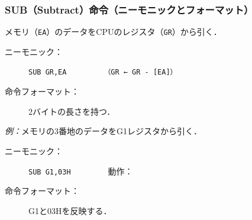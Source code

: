 \documentclass[handout]{beamer}        %
\begin{document}
\begin{frame}
  \frametitle{SUB（Subtract）命令（ニーモニックとフォーマット）}
  メモリ（\texttt{EA}）のデータをCPUのレジスタ（\texttt{GR}）から引く．

  \begin{description}
  \item[ニーモニック：]\texttt{SUB GR,EA}~~~~~~~~~\texttt{（GR ← GR - [EA]）}
    \vfill

  \item[命令フォーマット：] 2バイトの長さを持つ．\\
  \end{description}
  \vfill

  \emph{例：}メモリの3番地のデータをG1レジスタから引く．
  \begin{description}
  \item[ニーモニック：]\texttt{SUB G1,03H}~~~~~~~~~動作：

  \item[命令フォーマット：] G1と03Hを反映する．\\
  \end{description}
  \vfill
\end{frame}
\end{document}
